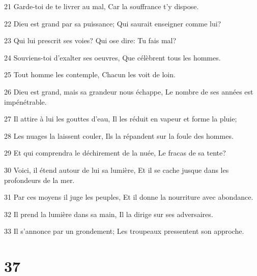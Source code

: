 \par 21 Garde-toi de te livrer au mal, Car la souffrance t'y dispose.
\par 22 Dieu est grand par sa puissance; Qui saurait enseigner comme lui?
\par 23 Qui lui prescrit ses voies? Qui ose dire: Tu fais mal?
\par 24 Souviens-toi d'exalter ses oeuvres, Que célèbrent tous les hommes.
\par 25 Tout homme les contemple, Chacun les voit de loin.
\par 26 Dieu est grand, mais sa grandeur nous échappe, Le nombre de ses années est impénétrable.
\par 27 Il attire à lui les gouttes d'eau, Il les réduit en vapeur et forme la pluie;
\par 28 Les nuages la laissent couler, Ils la répandent sur la foule des hommes.
\par 29 Et qui comprendra le déchirement de la nuée, Le fracas de sa tente?
\par 30 Voici, il étend autour de lui sa lumière, Et il se cache jusque dans les profondeurs de la mer.
\par 31 Par ces moyens il juge les peuples, Et il donne la nourriture avec abondance.
\par 32 Il prend la lumière dans sa main, Il la dirige sur ses adversaires.
\par 33 Il s'annonce par un grondement; Les troupeaux pressentent son approche.

\chapter{37}

